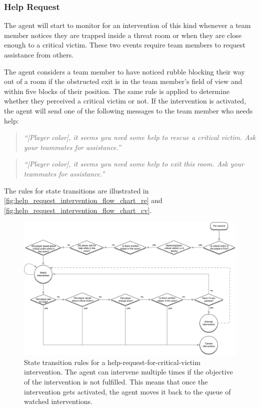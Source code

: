 \subsubsection{Help Request}

The agent will start to monitor for an intervention of this kind whenever a
team member notices they are trapped inside a threat room or when they are
close enough to a critical victim. These two events require team members to
request assistance from others.

The agent considers a team member to have noticed rubble blocking their way out
of a room if the obstructed exit is in the team member's field of view and
within five blocks of their position. The same rule is applied to determine
whether they perceived a critical victim or not. If the intervention is
activated, the agent will send one of the following messages to the team member
who needs help:

\begin{quote} 
    \emph{``[Player color], it seems you need some help to rescue a critical
    victim. Ask your teammates for assistance.''}
\end{quote}

\begin{quote} 
    \emph{``[Player color], it seems you need some help to exit this room. Ask
    your teammates for assistance.''}
\end{quote}

\noindent The rules for state transitions are illustrated in
\autoref{fig:help_request_intervention_flow_chart_re} and
\autoref{fig:help_request_intervention_flow_chart_cv}.

%
\begin{figure}
    \centering
    \includegraphics[width=\textwidth]{images/help_request_intervention_flow_chart_cv.pdf}
    \caption{%
        State transition rules for a help-request-for-critical-victim
        intervention. The agent can intervene multiple times if the objective
        of the intervention is not fulfilled. This means that once the
        intervention gets activated, the agent moves it back to the queue of
        watched interventions.
    }
    \label{fig:help_request_intervention_flow_chart_cv}
\end{figure}
%


